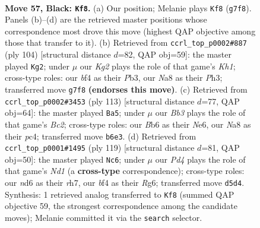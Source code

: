 \documentclass[11pt]{article}
\begin{document}
\clearpage

\begin{figure}[p]\centering
\begin{subfigure}{0.46\textwidth}\centering
\resizebox{\linewidth}{!}{%
\newchessgame
\chessboard[
  setfen={n7/1p1n2k1/1b1N4/p2p3b/5B1p/PP2P3/4P3/3B2K1 b - - 11 57},
  showmover=false,
  pgfstyle=straightmove, color=movearrow, markmove={g7-f8}
]}
\caption{}
\end{subfigure}\hfill
\begin{subfigure}{0.46\textwidth}\centering
\resizebox{\linewidth}{!}{%
\newchessgame
\chessboard[
  setfen={5r1k/2R3p1/7p/p3B2n/1bN5/1P3P1P/8/7K w - - 1 53},
  showmover=false,
  pgfstyle=straightmove, color=movearrow, markmove={h1-g2}
]}
\caption{}
\end{subfigure}
\\[4pt]
\begin{subfigure}{0.46\textwidth}\centering
\resizebox{\linewidth}{!}{%
\newchessgame
\chessboard[
  setfen={8/2b5/p3np2/5p1k/1NP2P2/6K1/3B3P/8 b - - 8 57},
  showmover=false,
  pgfstyle=straightmove, color=movearrow, markmove={c7-a5}
]}
\caption{}
\end{subfigure}\hfill
\begin{subfigure}{0.46\textwidth}\centering
\resizebox{\linewidth}{!}{%
\newchessgame
\chessboard[
  setfen={2kn4/1p5R/4pbr1/1p3p2/1P1P4/P7/1B2BP2/5K2 b - - 4 60},
  showmover=false,
  pgfstyle=straightmove, color=movearrow, markmove={d8-c6}
]}
\caption{}
\end{subfigure}
\caption{\textbf{Move 57, Black: \texttt{Kf8}.} (a) Our position; Melanie plays \texttt{Kf8} (\texttt{g7f8}). Panels (b)--(d) are the retrieved master positions whose correspondence most drove this move (highest QAP objective among those that transfer to it). (b) Retrieved from \texttt{ccrl\_top\_p0002\#887} (ply 104) [structural distance $d$=82, QAP obj=59]: the master played \texttt{Kg2}; under $\mu$ our \emph{Kg2} plays the role of that game's \emph{Kh1}; cross-type roles: our \emph{b}f4 as their \emph{P}b3, our \emph{N}a8 as their \emph{P}h3; transferred move \texttt{g7f8} \textbf{(endorses this move)}. (c) Retrieved from \texttt{ccrl\_top\_p0002\#3453} (ply 113) [structural distance $d$=77, QAP obj=64]: the master played \texttt{Ba5}; under $\mu$ our \emph{Bb3} plays the role of that game's \emph{Bc2}; cross-type roles: our \emph{B}b6 as their \emph{N}e6, our \emph{N}a8 as their \emph{p}c4; transferred move \texttt{b6e3}. (d) Retrieved from \texttt{ccrl\_top\_p0001\#1495} (ply 119) [structural distance $d$=81, QAP obj=50]: the master played \texttt{Nc6}; under $\mu$ our \emph{Pd4} plays the role of that game's \emph{Nd1} (a \textbf{cross-type} correspondence); cross-type roles: our \emph{n}d6 as their \emph{r}h7, our \emph{b}f4 as their \emph{R}g6; transferred move \texttt{d5d4}. Synthesis: 1 retrieved analog transferred to \texttt{Kf8} (summed QAP objective 59, the strongest correspondence among the candidate moves); Melanie committed it via the \texttt{search} selector.}
\label{fig:thought-m113}
\end{figure}
\end{document}
